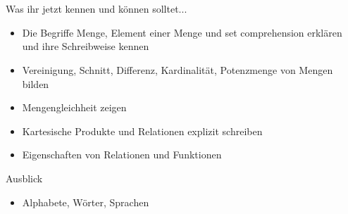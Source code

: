\section{}
	\begin{frame}{Was ihr jetzt kennen und können solltet...}
			\begin{itemize}
				\item Die Begriffe Menge, Element einer Menge und set comprehension erklären und ihre Schreibweise kennen
				\item Vereinigung, Schnitt, Differenz, Kardinalität, Potenzmenge von Mengen bilden
				\item Mengengleichheit zeigen
				\item Kartesische Produkte und Relationen explizit schreiben
				\item Eigenschaften von Relationen und Funktionen
			\end{itemize}
	
	\end{frame}
	\begin{frame}{Ausblick}
		\begin{itemize}
			\item Alphabete, Wörter, Sprachen
		\end{itemize}
	\end{frame}
\section{}
\questionframe
{}
{}
